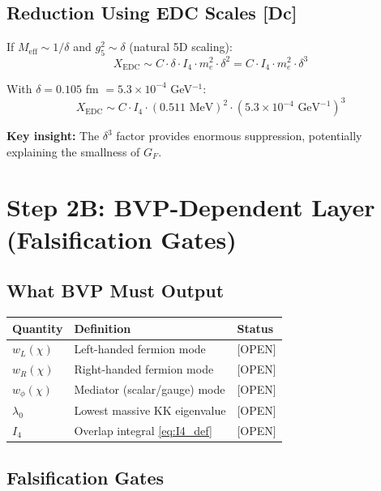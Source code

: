 \documentclass[11pt]{article}
\newcommand{\tagDc}{{\small\textsf{[Dc]}}}
\newcommand{\tagOPEN}{{\small\textsf{[OPEN]}}}
\begin{document}
\subsection{Reduction Using EDC Scales \tagDc{}}

If $M_{\text{eff}} \sim 1/\delta$ and $g_5^2 \sim \delta$ (natural 5D scaling):
\begin{equation}
    X_{\text{EDC}} \sim C \cdot \delta \cdot I_4 \cdot m_e^2 \cdot \delta^2 = C \cdot I_4 \cdot m_e^2 \cdot \delta^3
\end{equation}

With $\delta = 0.105$ fm $= 5.3 \times 10^{-4}$ GeV$^{-1}$:
\begin{equation}
    X_{\text{EDC}} \sim C \cdot I_4 \cdot (0.511 \text{ MeV})^2 \cdot (5.3 \times 10^{-4} \text{ GeV}^{-1})^3
\end{equation}

\textbf{Key insight:} The $\delta^3$ factor provides enormous suppression, potentially explaining the smallness of $G_F$.

\section{Step 2B: BVP-Dependent Layer (Falsification Gates)}

\subsection{What BVP Must Output}

\begin{center}
\begin{tabular}{lll}
\toprule
\textbf{Quantity} & \textbf{Definition} & \textbf{Status} \\
\midrule
$w_L(\chi)$ & Left-handed fermion mode & \tagOPEN{} \\
$w_R(\chi)$ & Right-handed fermion mode & \tagOPEN{} \\
$w_\phi(\chi)$ & Mediator (scalar/gauge) mode & \tagOPEN{} \\
$\lambda_0$ & Lowest massive KK eigenvalue & \tagOPEN{} \\
$I_4$ & Overlap integral \eqref{eq:I4_def} & \tagOPEN{} \\
\bottomrule
\end{tabular}
\end{center}

\subsection{Falsification Gates}
\end{document}
